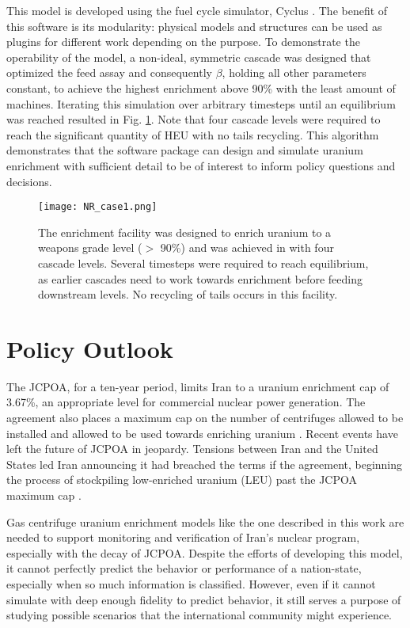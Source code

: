 \documentclass{article}
\begin{document}
This model is developed using the fuel cycle simulator, Cyclus \cite{cyclus}. The benefit of this software is its modularity: physical models and structures can be used as plugins for different work depending on the purpose. To demonstrate the operability of the model, a non-ideal, symmetric cascade was designed that optimized the feed assay and consequently $\beta$, holding all other parameters constant, to achieve the highest enrichment above 90\% with the least amount of machines. Iterating this simulation over arbitrary timesteps until an equilibrium was reached resulted in Fig. \ref{fig:enrichment}. Note that four cascade levels were required to reach the significant quantity of HEU with no tails recycling. This algorithm demonstrates that the software package can design and simulate uranium enrichment with sufficient detail to be of interest to inform policy questions and decisions.

\begin{figure}[t!]
    \centering
    \texttt{[image: NR\_case1.png]}
    \caption{The enrichment facility was designed to enrich uranium to a weapons grade level ($>$ 90\%) and was achieved in with four cascade levels. Several timesteps were required to reach equilibrium, as earlier cascades need to work towards enrichment before feeding downstream levels. No recycling of tails occurs in this facility.}
    \label{fig:enrichment}
\end{figure}

\section{Policy Outlook}

The JCPOA, for a ten-year period, limits Iran to a uranium enrichment cap of 3.67\%, an appropriate level for commercial nuclear power generation. The agreement also places a maximum cap on the number of centrifuges allowed to be installed and allowed to be used towards enriching uranium \cite{jcpoa}. Recent events have left the future of JCPOA in jeopardy. Tensions between Iran and the United States led Iran announcing it had breached the terms if the agreement, beginning the process of stockpiling low-enriched uranium (LEU) past the JCPOA maximum cap \cite{ap_news}.

Gas centrifuge uranium enrichment models like the one described in this work are needed to support monitoring and verification of Iran’s nuclear program, especially with the decay of JCPOA. Despite the efforts of developing this model, it cannot perfectly predict the behavior or performance of a nation-state, especially when so much information is classified. However, even if it cannot simulate with deep enough fidelity to predict behavior, it still serves a purpose of studying possible scenarios that the international community might experience.
\end{document}

